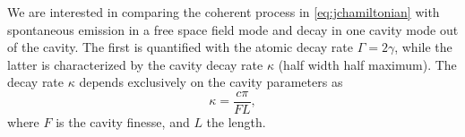 We are interested in comparing the coherent process in \eqref{eq:jchamiltonian} with spontaneous emission in a free space field mode and decay in one cavity mode out of the cavity. The first is quantified with the atomic decay rate $\Gamma = 2\gamma$, while the latter is characterized by the cavity decay rate $\kappa$ (half width half maximum). The decay rate $\kappa$ depends exclusively on the cavity parameters as \cite{helene}
\begin{equation}
\kappa =\frac{c\pi}{FL},
\end{equation}
where $F$ is the cavity finesse, and $L$ the length. %
